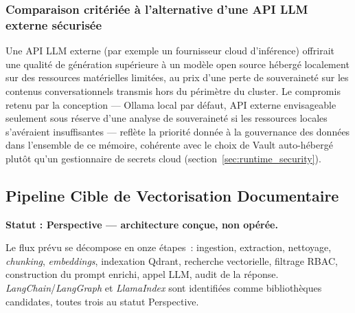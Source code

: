 \subsubsection{Comparaison critériée à l'alternative d'une API LLM externe sécurisée}
Une API LLM externe (par exemple un fournisseur cloud d'inférence) offrirait une qualité de génération supérieure à un modèle open source hébergé localement sur des ressources matérielles limitées, au prix d'une perte de souveraineté sur les contenus conversationnels transmis hors du périmètre du cluster. Le compromis retenu par la conception — Ollama local par défaut, API externe envisageable seulement sous réserve d'une analyse de souveraineté si les ressources locales s'avéraient insuffisantes — reflète la priorité donnée à la gouvernance des données dans l'ensemble de ce mémoire, cohérente avec le choix de Vault auto-hébergé plutôt qu'un gestionnaire de secrets cloud (section~\ref{sec:runtime_security}).

\subsection{Pipeline Cible de Vectorisation Documentaire}
\textbf{Statut : Perspective — architecture conçue, non opérée.}

Le flux prévu se décompose en onze étapes~: ingestion, extraction, nettoyage, \textit{chunking}, \textit{embeddings}, indexation Qdrant, recherche vectorielle, filtrage RBAC, construction du prompt enrichi, appel LLM, audit de la réponse. \textit{LangChain}/\textit{LangGraph} et \textit{LlamaIndex} sont identifiées comme bibliothèques candidates, toutes trois au statut Perspective.

